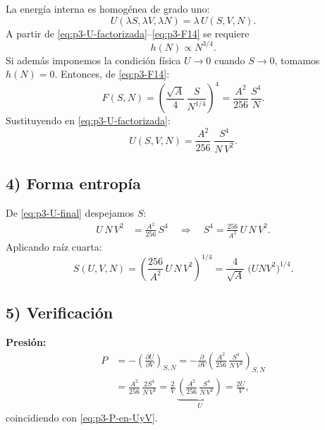 \documentclass{article}
\begin{document}
La energía interna es homogénea de grado uno:
\begin{equation}
U(\lambda S,\lambda V,\lambda N)=\lambda\,U(S,V,N).
\label{eq:p3-extensiva}
\end{equation}
A partir de \eqref{eq:p3-U-factorizada}–\eqref{eq:p3-F14} se requiere
\begin{equation}
h(N)\propto N^{3/4}.
\label{eq:p3-h-escala}
\end{equation}
Si además imponemos la condición física \(U\to 0\) cuando \(S\to 0\), tomamos \(h(N)=0\).  
Entonces, de \eqref{eq:p3-F14}:
\begin{equation}
F(S,N)=\left(\frac{\sqrt{A}}{4}\,\frac{S}{N^{1/4}}\right)^{4}
=\frac{A^{2}}{256}\,\frac{S^{4}}{N}.
\label{eq:p3-F-final}
\end{equation}
Sustituyendo en \eqref{eq:p3-U-factorizada}:
\begin{equation}
U(S,V,N)=\frac{A^{2}}{256}\;\frac{S^{4}}{N\,V^{2}}.
\label{eq:p3-U-final}
\end{equation}

\subsection*{4) Forma entropía}

De \eqref{eq:p3-U-final} despejamos \(S\):
\begin{equation}
\begin{split}
U\,N\,V^{2}
&= \frac{A^{2}}{256}\,S^{4}
\quad\Longrightarrow\quad
S^{4}=\frac{256}{A^{2}}\,U\,N\,V^{2}.
\end{split}
\label{eq:p3-S4}
\end{equation}
Aplicando raíz cuarta:
\begin{equation}
S(U,V,N)=\left(\frac{256}{A^{2}}\,U\,N\,V^{2}\right)^{\!1/4}
=\frac{4}{\sqrt{A}}\;\big(U N V^{2}\big)^{1/4}.
\label{eq:p3-S-forma}
\end{equation}

\subsection*{5) Verificación}

\textbf{Presión:}
\begin{equation}
\begin{split}
P
&= -\left(\frac{\partial U}{\partial V}\right)_{S,N}
= -\frac{\partial}{\partial V}\!\left(\frac{A^{2}}{256}\,\frac{S^{4}}{N\,V^{2}}\right)_{S,N} \\[4pt]
&= \frac{A^{2}}{256}\,\frac{2S^{4}}{N\,V^{3}}
= \frac{2}{V}\,
\underbrace{\left(\frac{A^{2}}{256}\,\frac{S^{4}}{N\,V^{2}}\right)}_{U}
= \frac{2U}{V},
\end{split}
\label{eq:p3-P-check}
\end{equation}
coincidiendo con \eqref{eq:p3-P-en-UyV}.
\end{document}
